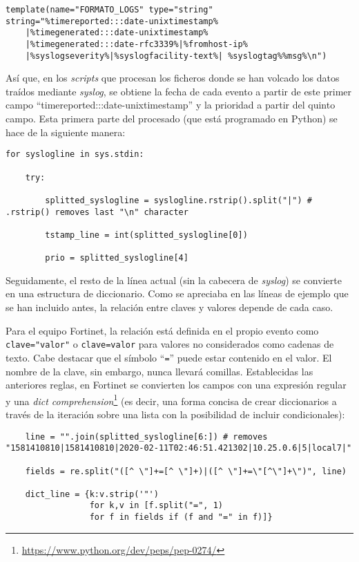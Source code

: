 \begin{verbatim}
template(name="FORMATO_LOGS" type="string"
string="%timereported:::date-unixtimestamp%
    |%timegenerated:::date-unixtimestamp%
    |%timegenerated:::date-rfc3339%|%fromhost-ip%
    |%syslogseverity%|%syslogfacility-text%| %syslogtag%%msg%\n")
\end{verbatim}

Así que, en los \emph{scripts} que procesan los ficheros donde se han volcado los datos traídos mediante \emph{syslog},
se obtiene la fecha de cada evento a partir de este primer campo ``timereported:::date-unixtimestamp'' y la prioridad a partir del quinto campo.
Esta primera parte del procesado (que está programado en Python) se hace de la siguiente manera:

\begin{verbatim}
for syslogline in sys.stdin:

    try:

        splitted_syslogline = syslogline.rstrip().split("|") # .rstrip() removes last "\n" character

        tstamp_line = int(splitted_syslogline[0])

        prio = splitted_syslogline[4]
\end{verbatim}

Seguidamente, el resto de la línea actual (sin la cabecera de \emph{syslog}) se convierte en una estructura de diccionario.
Como se apreciaba en las líneas de ejemplo que se han incluido antes, la relación entre claves y valores depende de cada caso.

Para el equipo Fortinet, la relación está definida en el propio evento como \texttt{clave="valor"} o \texttt{clave=valor} para valores no considerados como cadenas de texto.
Cabe destacar que el símbolo ``\texttt{=}'' puede estar contenido en el valor.
El nombre de la clave, sin embargo, nunca llevará comillas.
Establecidas las anteriores reglas, en Fortinet se convierten los campos con una expresión regular y una \emph{dict comprehension}\footnote{\url{https://www.python.org/dev/peps/pep-0274/}}
(es decir, una forma concisa de crear diccionarios a través de la iteración sobre una lista con la posibilidad de incluir condicionales):

\begin{verbatim}
    line = "".join(splitted_syslogline[6:]) # removes "1581410810|1581410810|2020-02-11T02:46:51.421302|10.25.0.6|5|local7|"

    fields = re.split("([^ \"]+=[^ \"]+)|([^ \"]+=\"[^\"]+\")", line)

    dict_line = {k:v.strip('"')
                 for k,v in [f.split("=", 1)
                 for f in fields if (f and "=" in f)]}
\end{verbatim}

